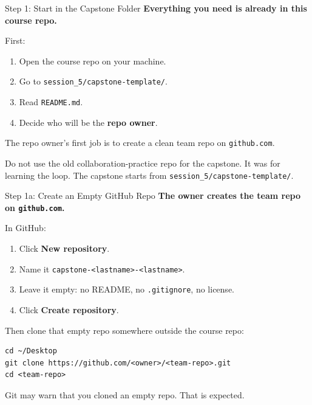 \documentclass[aspectratio=169, 11pt]{beamer}
\begin{document}
\begin{frame}{Step 1: Start in the Capstone Folder}
  \textbf{Everything you need is already in this course repo.}

  \vspace{0.6em}
  First:
  \begin{enumerate}\small
    \item Open the course repo on your machine.
    \item Go to \texttt{session\_5/capstone-template/}.
    \item Read \texttt{README.md}.
    \item Decide who will be the \textbf{repo owner}.
  \end{enumerate}

  \vspace{0.6em}
  The repo owner's first job is to create a clean team repo on \texttt{github.com}.

  \vspace{0.6em}
  \alert{\small Do not use the old collaboration-practice repo for the capstone. It was for learning the loop. The capstone starts from \texttt{session\_5/capstone-template/}.}
\end{frame}

\begin{frame}[fragile]{Step 1a: Create an Empty GitHub Repo}
  \textbf{The owner creates the team repo on \texttt{github.com}.}

  \vspace{0.4em}
  In GitHub:
  \begin{enumerate}\small
    \item Click \textbf{New repository}.
    \item Name it \texttt{capstone-<lastname>-<lastname>}.
    \item Leave it empty: no README, no \texttt{.gitignore}, no license.
    \item Click \textbf{Create repository}.
  \end{enumerate}

  \vspace{0.5em}
  Then clone that empty repo somewhere outside the course repo:
  \begin{lstlisting}[basicstyle=\ttfamily\scriptsize]
cd ~/Desktop
git clone https://github.com/<owner>/<team-repo>.git
cd <team-repo>
  \end{lstlisting}

  \vspace{0.3em}
  \alert{\small Git may warn that you cloned an empty repo. That is expected.}
\end{frame}
\end{document}
